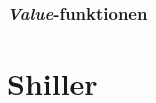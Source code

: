 \documentclass[
  a4paper,
  oneside]{memoir}
\begin{document}
\hypertarget{value-funktionen-1}{%
\subsection{\texorpdfstring{\emph{Value}-funktionen}{Value-funktionen}}\label{value-funktionen-1}}

\hypertarget{shiller}{%
\chapter{Shiller}\label{shiller}}

\nocite{*}

  
\end{document}
